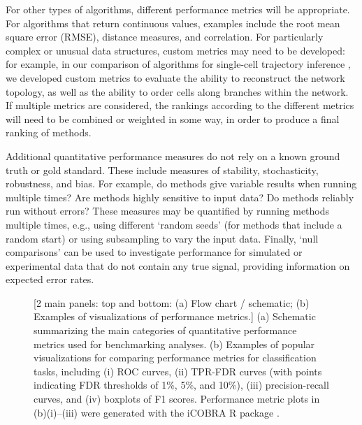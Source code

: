 \documentclass[12pt, a4paper]{article}
\begin{document}
For other types of algorithms, different performance metrics will be appropriate. For algorithms that return continuous values, examples include the root mean square error (RMSE), distance measures, and correlation. For particularly complex or unusual data structures, custom metrics may need to be developed: for example, in our comparison of algorithms for single-cell trajectory inference \citep{Saelens2018b}, we developed custom metrics to evaluate the ability to reconstruct the network topology, as well as the ability to order cells along branches within the network. If multiple metrics are considered, the rankings according to the different metrics will need to be combined or weighted in some way, in order to produce a final ranking of methods.

Additional quantitative performance measures do not rely on a known ground truth or gold standard. These include measures of stability, stochasticity, robustness, and bias. For example, do methods give variable results when running multiple times? Are methods highly sensitive to input data? Do methods reliably run without errors? These measures may be quantified by running methods multiple times, e.g., using different `random seeds' (for methods that include a random start) or using subsampling to vary the input data. Finally, `null comparisons' can be used to investigate performance for simulated or experimental data that do not contain any true signal, providing information on expected error rates.



\vskip 5mm

\begin{figure}[H]
\begin{center}
\end{center}
\caption{[2 main panels: top and bottom: (a) Flow chart / schematic; (b) Examples of visualizations of performance metrics.] (a) Schematic summarizing the main categories of quantitative performance metrics used for benchmarking analyses. (b) Examples of popular visualizations for comparing performance metrics for classification tasks, including (i) ROC curves, (ii) TPR-FDR curves (with points indicating FDR thresholds of 1\%, 5\%, and 10\%), (iii) precision-recall curves, and (iv) boxplots of F1 scores. Performance metric plots in (b)(i)--(iii) were generated with the iCOBRA R package \citep{Soneson2016}.}
\label{fig:performance_metrics}
\end{figure}
\end{document}
